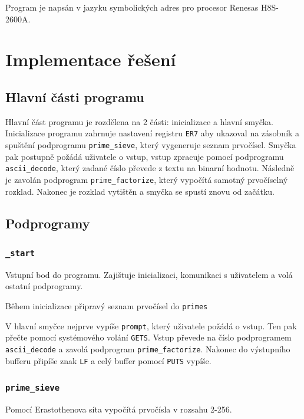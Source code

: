 \documentclass[12pt]{article}
\newcommand{\code}[1]{\mbox{\texttt{#1}}}
\begin{document}
Program je napsán v jazyku symbolických adres pro procesor Renesas H8S-2600A.

\section{Implementace řešení}

\subsection{Hlavní části programu}

Hlavní část programu je rozdělena na 2 části: inicializace a hlavní smyčka. Inicializace programu
zahrnuje nastavení registru \code{ER7} aby ukazoval na zásobník a spuštění podprogramu
\code{prime\_sieve}, který vygeneruje seznam prvočísel. Smyčka pak postupně požádá uživatele o
vstup, vstup zpracuje pomocí podprogramu \code{ascii\_decode}, který zadané číslo převede z textu
na binarní hodnotu. Následně je zavolán podprogram \code{prime\_factorize}, který vypočítá samotný
prvočíselný rozklad. Nakonec je rozklad vytištěn a smyčka se spustí znovu od začátku.

\subsection{Podprogramy}

\subsubsection{\code{\_start}}

Vstupní bod do programu. Zajištuje inicializaci, komunikaci s uživatelem a volá ostatní
podprogramy.

Během inicializace připravý seznam prvočísel do \code{primes}

V hlavní smyčce nejprve vypíše \code{prompt}, který uživatele požádá o vstup. Ten pak přečte pomocí
systémového volání \code{GETS}. Vstup převede na číslo podprogramem \code{ascii\_decode} a
zavolá podprogram \code{prime\_factorize}. Nakonec do výstupního bufferu připíše znak \code{LF} a
celý buffer pomocí \code{PUTS} vypíše.

\subsubsection{\code{prime\_sieve}}

Pomocí Erastothenova síta vypočítá prvočísla v rozsahu 2-256.
\end{document}
